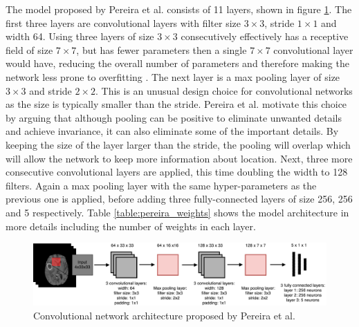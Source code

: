 \documentclass[12pt,a4paper,twoside,openright]{report}
\begin{document}
The model proposed by Pereira et al. \cite{pereira} consists of 11 layers, shown in figure \ref{fig:pereira_model}. The first three layers are convolutional layers with filter size $3 \times 3$, stride $1 \times 1$ and width 64. Using three layers of size $3 \times 3$ consecutively effectively has a receptive field of size $7 \times 7$, but has fewer parameters then a single $7 \times 7$ convolutional layer would have, reducing the overall number of parameters and therefore making the network less prone to overfitting \cite{very_deep_conv_nets}. The next layer is a max pooling layer of size $3 \times 3$ and stride $2 \times 2$. This is an unusual design choice for convolutional networks as the size is typically smaller than the stride. Pereira et al. motivate this choice by arguing that although pooling can be positive to eliminate unwanted details and achieve invariance, it can also eliminate some of the important details. By keeping the size of the layer larger than the stride, the pooling will overlap which will allow the network to keep more information about location. Next, three more consecutive convolutional layers are applied, this time doubling the width to 128 filters. Again a max pooling layer with the same hyper-parameters as the previous one is applied, before adding three fully-connected layers of size 256, 256 and 5 respectively. Table \ref{table:pereira_weights} shows the model architecture in more details including the number of weights in each layer. 

\begin{figure}
	\centering
	\includegraphics[width=\textwidth]{pereira_model}
	\caption{Convolutional network architecture proposed by Pereira et al.}
	\label{fig:pereira_model}
\end{figure}
\end{document}
